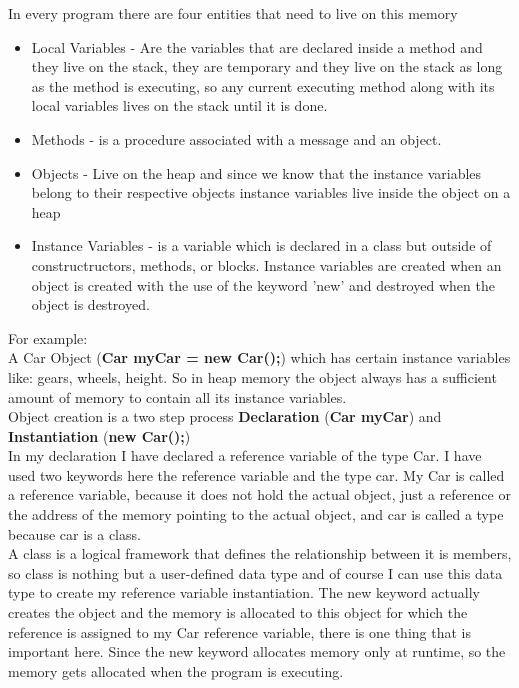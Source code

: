 \documentclass[
	12pt, %
]{fphw}
\begin{document}
In every program there are four entities that need to live on this memory

\begin{itemize}
\item Local Variables - Are the variables that are declared inside a method and they live on the stack, they are temporary and they live on the stack as long as the method is executing, so any current executing method along with its local variables lives on the stack until it is done.
\item Methods - is a procedure associated with a message and an object.
\item Objects - Live on the heap and since we know that the instance variables belong to their respective objects instance variables live inside the object on a heap
\item Instance Variables - is a variable which is declared in a class but outside of constructructors, methods, or blocks. Instance variables are created when an object is created with the use of the keyword 'new' and destroyed when the object is destroyed.
\end{itemize}

For example:\\

A Car Object (\textbf{Car myCar = new Car();}) which has certain instance variables like: gears, wheels, height. So in heap memory the object always has a sufficient amount of memory to contain all its instance variables. \\

Object creation is a two step process \textbf{Declaration} (\textbf{Car myCar}) and \textbf{Instantiation} (\textbf{new Car();}) \\
In my declaration I have declared a reference variable of the type Car. I have used two keywords here the reference variable and the type car. My Car is called a reference variable, because it does not hold the actual object, just a reference or the address of the memory pointing to the actual object, and car is called a type because car is a class.\\

A class is a logical framework that defines the relationship between it is members, so class is nothing but a user-defined data type and of course I can use this data type to create my reference variable instantiation. The new keyword actually creates the object and the memory is allocated to this object for which the reference is assigned to my Car reference variable, there is one thing that is important here. Since the new keyword allocates memory only at runtime, so the memory gets allocated when the program is executing.\\
\end{document}

